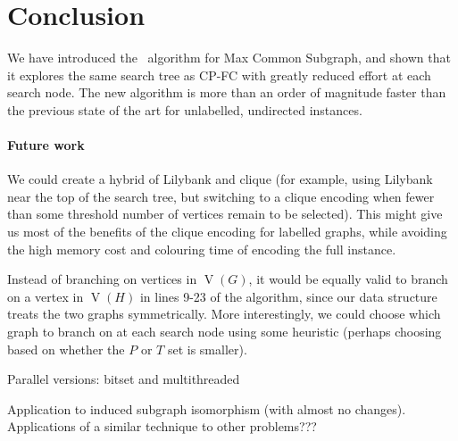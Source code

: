 \documentclass[letterpaper]{article}
\newcommand{\McSplit}{\textproc{McSplit}}
\DeclareMathOperator{\V}{V}
\begin{document}
\section{Conclusion}

We have introduced the \McSplit\ algorithm for Max Common Subgraph, and shown
that it explores the same search tree as CP-FC with greatly reduced effort at
each search node.  The new algorithm is more than an order of
magnitude faster than the previous state of the art for unlabelled, undirected
instances.

\paragraph{Future work} We could create a hybrid of Lilybank and clique (for
example, using Lilybank near the top of the search tree, but switching to a
clique encoding when fewer than some threshold number of vertices remain to be
selected). This might give us most of the benefits of the clique encoding for
labelled graphs, while avoiding the high memory cost and colouring time of
encoding the full instance.

Instead of branching on vertices in $\V(G)$, it would be equally valid to branch on
a vertex in $\V(H)$ in lines 9-23 of the algorithm, since our data structure treats the
two graphs symmetrically. More interestingly, we could choose which graph to branch on
at each search node using some heuristic (perhaps choosing based on whether the $P$ or
$T$ set is smaller).

Parallel versions: bitset and multithreaded

Application to induced subgraph isomorphism (with almost no changes). Applications
of a similar technique to other problems???



\end{document}
